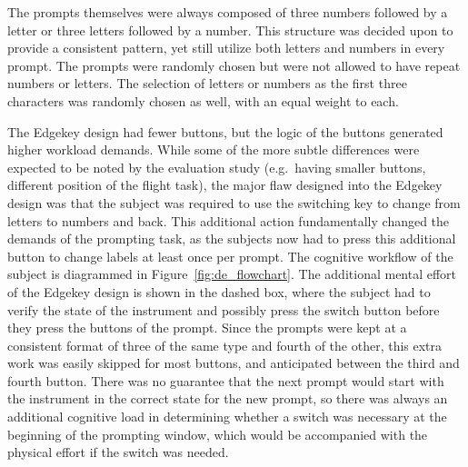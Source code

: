 The prompts themselves were always composed of three numbers followed by a letter or three letters followed by a number.
This structure was decided upon to provide a consistent pattern, yet still utilize both letters and numbers in every prompt.
The prompts were randomly chosen but were not allowed to have repeat numbers or letters. %
The selection of letters or numbers as the first three characters was randomly chosen as well, with an equal weight to each.

The Edgekey design had fewer buttons, but the logic of the buttons generated higher workload demands.
While some of the more subtle differences were expected to be noted by the evaluation study (e.g.\ having smaller buttons, different position of the flight task), the major flaw designed into the Edgekey design was that the subject was required to use the switching key to change from letters to numbers and back.
This additional action fundamentally changed the demands of the prompting task, as the subjects now had to press this additional button to change labels at least once per prompt.
The cognitive workflow of the subject is diagrammed in Figure~\ref{fig:de_flowchart}.
The additional mental effort of the Edgekey design is shown in the dashed box, where the subject had to verify the state of the instrument and possibly press the switch button before they press the buttons of the prompt.
Since the prompts were kept at a consistent format of three of the same type and fourth of the other, this extra work was easily skipped for most buttons, and anticipated between the third and fourth button.
There was no guarantee that the next prompt would start with the instrument in the correct state for the new prompt, so there was always an additional cognitive load in determining whether a switch was necessary at the beginning of the prompting window, which would be accompanied with the physical effort if the switch was needed.

